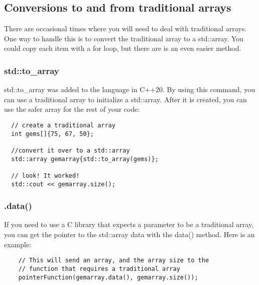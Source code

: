 \subsection{Conversions to and from traditional arrays}
There are occasional times where you will need to deal with traditional arrays.
One way to handle this is to convert the traditional array to a std::array.
You could copy each item with a for loop, but there are is an even easier method.

\subsubsection{std::to\_array}
std::to\_array was added to the language in C++20. By using this command, you
can use a traditional array to initialize a std::array. After it is created, you 
can use the safer array for the rest of your code:
\begin{lstlisting}
  // create a traditional array
  int gems[]{75, 67, 50};
  
  //convert it over to a std::array
  std::array gemarray{std::to_array(gems)};
  
  // look! It worked!
  std::cout << gemarray.size();  
\end{lstlisting}
\subsubsection{.data()}
If you need to use a C library that expects a parameter to be a traditional array,
you can get the pointer to the std::array data with the data() method. Here is an
example:
\begin{lstlisting}
    // This will send an array, and the array size to the 
    // function that requires a traditional array
    pointerFunction(gemarray.data(), gemarray.size());
\end{lstlisting}
